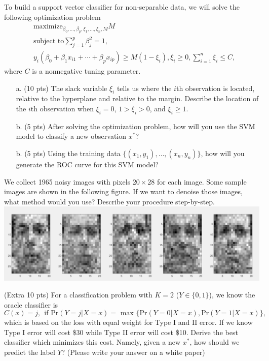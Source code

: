 \documentclass[11pt,letter]{exam}
\begin{document}
\begin{questions}
\question To build a support vector classifier for non-separable data, we will solve the following optimization problem
\begin{align*}
&\text{maximize}_{\beta_0, \ldots, \beta_p, \xi_1, \ldots, \xi_n, M} M \\
&\text{subject to} \sum_{j= 1}^p \beta_j^2 = 1,  \\
& y_i(\beta_0 + \beta_1 x_{i1} + \cdots + \beta_p x_{ip}) \geq M(1 -\xi_i),
\xi_i \geq 0, \sum_{i =1}^n \xi_i \leq C, 
\end{align*}
where $C$ is a nonnegative tuning parameter. 
	\begin{itemize}
	\item[a.] (10 pts) The slack variable $\xi_i$ tells us where the $i$th observation is located, relative to the hyperplane and relative to the margin. Describe the location of the $i$th observation when $\xi_i = 0$, $ 1 > \xi_i >0$, and $\xi_i \geq 1$.
	\item[b.] (5 pts) After solving the optimization problem, how will you use the SVM model to classify a new observation $x^*$?
	\item[b.] (5 pts) Using the training data $\{(x_1, y_1), \ldots, (x_n, y_n)  \}$, how will you generate the ROC curve for this SVM model?
	\end{itemize}
\newpage

\question[10] We collect 1965 noisy images with pixels $20\times 28$ for each image. Some sample images are shown in the following figure. If we want to denoise those images, what method would you use? Describe your procedure step-by-step.\\
\includegraphics[scale=1]{fig2.png}

\vspace{3 in}
\item (Extra 10 pts) For a classification problem with $K = 2$ ($Y \in \{0, 1\}$), we know the oracle classifier is 
	\[
	C(x) = j, \ \ \text{if $\text{Pr}(Y = j | X = x) = $ max $\{ \text{Pr}(Y = 0 | X = x), \text{Pr}(Y = 1 | X = x) \}$},
	\]
	which is based on the loss with equal weight for Type I and II error. If we know Type I error will cost \$30 while Type II error will cost \$10. Derive the best classifier which minimizes this cost. Namely, given a new $x^*$, how should we predict the label $Y$? (Please write your answer on a white paper)



\end{questions}
\end{document}
